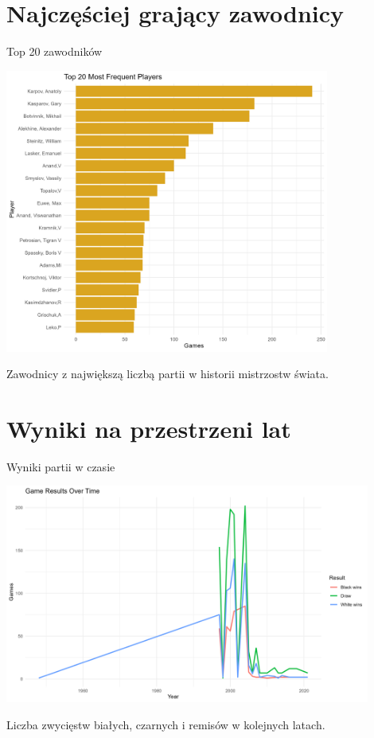 \documentclass{beamer}
\begin{document}
\section{Najczęściej grający zawodnicy}
\begin{frame}{Top 20 zawodników}
  \begin{center}
    \includegraphics[width=0.8\textwidth]{../../ChessPlots/top20_players.png}
  \end{center}
  \small
  Zawodnicy z największą liczbą partii w historii mistrzostw świata.
\end{frame}

\section{Wyniki na przestrzeni lat}
\begin{frame}{Wyniki partii w czasie}
  \begin{center}
    \includegraphics[width=0.9\textwidth]{../../ChessPlots/results_over_time.png}
  \end{center}
  \small
  Liczba zwycięstw białych, czarnych i remisów w kolejnych latach.
\end{frame}
\end{document}
